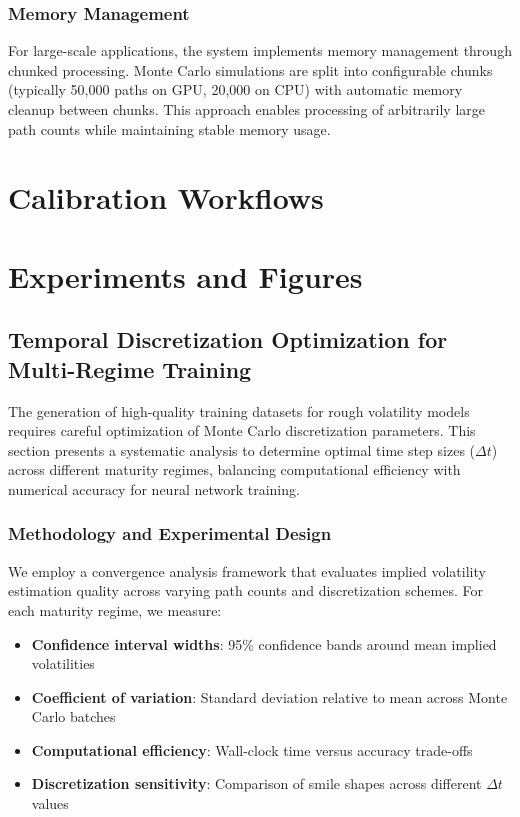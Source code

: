 	\subsection{Memory Management}
	
	For large-scale applications, the system implements memory management through chunked processing. Monte Carlo simulations are split into configurable chunks (typically 50,000 paths on GPU, 20,000 on CPU) with automatic memory cleanup between chunks. This approach enables processing of arbitrarily large path counts while maintaining stable memory usage.

	\chapter{Calibration Workflows}
	\label{ch:calib}
	
	\chapter{Experiments and Figures}
	\section{Temporal Discretization Optimization for Multi-Regime Training}
	\label{sec:discretization-optimization}
	
	The generation of high-quality training datasets for rough volatility models requires careful optimization of Monte Carlo discretization parameters. This section presents a systematic analysis to determine optimal time step sizes ($\Delta t$) across different maturity regimes, balancing computational efficiency with numerical accuracy for neural network training.
	
	\subsection{Methodology and Experimental Design}
	
	We employ a convergence analysis framework that evaluates implied volatility estimation quality across varying path counts and discretization schemes. For each maturity regime, we measure:
	
	\begin{itemize}[nosep]
		\item \textbf{Confidence interval widths}: 95\% confidence bands around mean implied volatilities
		\item \textbf{Coefficient of variation}: Standard deviation relative to mean across Monte Carlo batches
		\item \textbf{Computational efficiency}: Wall-clock time versus accuracy trade-offs
		\item \textbf{Discretization sensitivity}: Comparison of smile shapes across different $\Delta t$ values
	\end{itemize}
	
